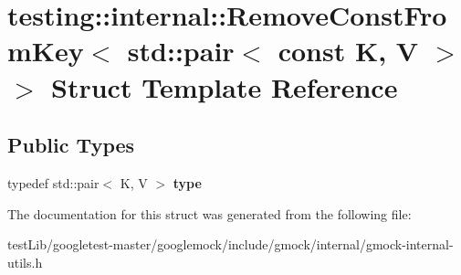 \hypertarget{structtesting_1_1internal_1_1RemoveConstFromKey_3_01std_1_1pair_3_01const_01K_00_01V_01_4_01_4}{}\section{testing\+:\+:internal\+:\+:Remove\+Const\+From\+Key$<$ std\+:\+:pair$<$ const K, V $>$ $>$ Struct Template Reference}
\label{structtesting_1_1internal_1_1RemoveConstFromKey_3_01std_1_1pair_3_01const_01K_00_01V_01_4_01_4}
\subsection*{Public Types}
\begin{DoxyCompactItemize}
\item 
\mbox{\label{structtesting_1_1internal_1_1RemoveConstFromKey_3_01std_1_1pair_3_01const_01K_00_01V_01_4_01_4_ac1d76274964aa8172889a4714246e86f}} 
typedef std\+::pair$<$ K, V $>$ {\bfseries type}
\end{DoxyCompactItemize}


The documentation for this struct was generated from the following file\+:\begin{DoxyCompactItemize}
\item 
test\+Lib/googletest-\/master/googlemock/include/gmock/internal/gmock-\/internal-\/utils.\+h\end{DoxyCompactItemize}
